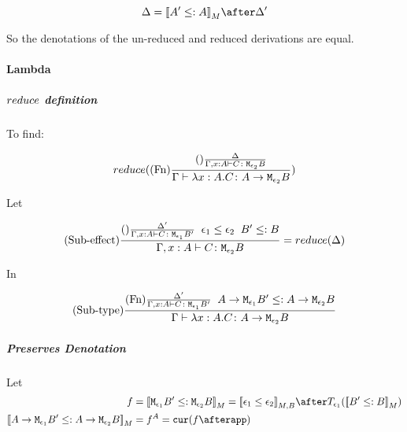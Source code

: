 {            \begin{equation}
                \D = \deno{A' \subtype A}\after\D'
            \end{equation}

            So the denotations of the un-reduced and reduced derivations are equal.

            \paragraph{Lambda}
            \subparagraph{$reduce$ definition}
                To find:
            
                \begin{equation}
                    reduce((\text{Fn}) \frac{
                        (\text{}) \frac{\Delta}{\Gamma, x: A \vdash C \colon \texttt{M}_{\epsilon_2}{B}}
                    }{\Gamma \vdash \lambda x : A. C \colon A \rightarrow \texttt{M}_{\epsilon_2}{B}})
                \end{equation}

                Let 

                \begin{equation}
                    (\text{Sub-effect}) \frac{
                        (\text{}) \frac{\Delta'}{\Gamma, x: A \vdash C \colon \texttt{M}_{\epsilon_1}{B'}}
                        \;\;
                        \epsilon_1\leq\epsilon_2
                        \;\;
                        B' \leq: B
                    }{
                        \Gamma, x: A \vdash C \colon \texttt{M}_{\epsilon_2}{B}
                    } = reduce(\Delta)
                \end{equation}

                In

                \begin{equation}
                    (\text{Sub-type}) \frac{
                        (\text{Fn}) \frac{
                            \Delta'
                        }{
                            \Gamma, x: A \vdash C \colon \texttt{M}_{\epsilon_1}{B'}
                        }
                        \;\;
                        A \rightarrow \texttt{M}_{\epsilon_1}{B'}\leq:A \rightarrow \texttt{M}_{\epsilon_2}{B}
                    }{
                        \Gamma \vdash \lambda x : A. C \colon A \rightarrow \texttt{M}_{\epsilon_2}{B}
                    }
                \end{equation}

            \subparagraph{Preserves Denotation}
                Let
                \begin{align}
                    f &= \deno{\M{\e_1}{B'}\subtype\M{\e_2}{B}} = \db{\e_1\subeffect\e_2}_{M, B}\after\T{\e_1}{(\deno{B'\subtype B})} \\
                    \deno{\lamtype{A}{\e_1}{B'}\subtype\lamtype{A}{\e_2}{B}} & = f^A = \cur{f\after \app}
                \end{align}

}
